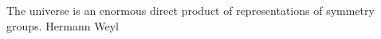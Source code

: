 \begin{dedication}
    The universe is an enormous direct product of representations of symmetry groups. 
    \hfill{Hermann Weyl}
\end{dedication}